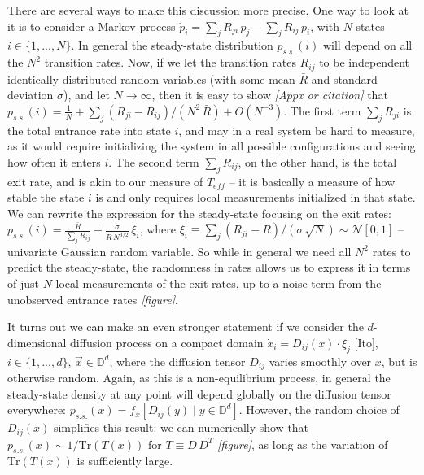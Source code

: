 \documentclass[11pt]{article}
\renewcommand{\v}[1]{\ensuremath{\vec{#1}}} %
\newcommand{\tr}{\mbox{Tr}}
\renewcommand{\=}[1]{\stackrel{#1}{=}} %
\renewcommand{\(}{\left (}
\renewcommand{\)}{\right  )}
\renewcommand{\[}{\left [}
\renewcommand{\]}{\right ]}
\newcommand{\<}{\left <}
\renewcommand{\>}{\right >}
\theoremstyle{definition}
\theoremstyle{remark}
\newcommand{\bigO}[1]{O(#1)}  %
\renewcommand{\todo}[1]{\textit{\color{red}[#1]}}
\begin{document}
There are several ways to make this discussion more precise. One way to look at it is to consider a Markov process $ \dot{p}_i= \sum_j R_{ji}\, p_j - \sum_j R_{ij}\, p_i $, with $ N $ states $ i\in\{1,...,N\} $. In general the steady-state distribution $ p_{s.s.}(i) $ will depend on all the $ N^2 $ transition rates. Now, if we let the transition rates $ R_{ij} $ to be independent identically distributed random variables (with some mean $ \bar{R} $ and standard deviation $ \sigma $), and let $ N \rightarrow \infty$, then it is easy to show \todo{Appx or citation} that $ p_{s.s.}(i)= \frac{1}{N} + \sum_j (R_{ji} - R_{ij})/(N^2\,\bar{R}) + \bigO{N^{-3}}$. The first term $ \sum_j R_{ji} $ is the total entrance rate into state $ i $, and may in a real system be hard to measure, as it would require initializing the system in all possible configurations and seeing how often it enters $ i $. The second term $ \sum_j R_{ij} $, on the other hand, is the total exit rate, and is akin to our measure of $ T_{eff} $ -- it is basically a measure of how stable the state $ i $ is and only requires local measurements initialized in that state. We can rewrite the expression for the steady-state focusing on the exit rates: $ p_{s.s.}(i)= \frac{\bar{R}}{\sum_j R_{ij}} + \frac{\sigma}{\bar{R}\,N^{3/2}}\, \xi_i$, where $ \xi_i \equiv  \sum_j \(R_{ji}-\bar{R}\)/\(\sigma\,\sqrt{N}\)\sim 
\mathcal{N}[0,1]$ -- univariate Gaussian random variable. So while in general we need all $ N^2 $ rates to predict the steady-state, the randomness in rates allows us to express it in terms of just $ N $ local measurements of the exit rates, up to a noise term from  the unobserved entrance rates \todo{figure}.

It turns out we can make an even stronger statement if we consider the $ d $-dimensional diffusion process on a compact domain $ \dot{x}_i = D_{ij}(x)\cdot\xi_j $ [Ito], $ i\in\{1,...,d\} $, $ \v{x}\in\mathbb{D}^d $, where the diffusion tensor $ D_{ij} $ varies smoothly over $ x $, but is otherwise random. Again, as this is a non-equilibrium process, in general the steady-state density at any point will depend globally on the diffusion tensor everywhere: $ p_{s.s.}(x) = f_x\[D_{ij}(y)\; |\; y\in \mathbb{D}^d \]$. However, the random choice of $ D_{ij}(x) $ simplifies this result: we can numerically show that $ p_{s.s.}(x) \sim 1/\tr\(T(x)\) $ for $ T \equiv D\, D^T$ \todo{figure}, as long as the variation of $ \tr\(T(x)\) $ is sufficiently large. 
\end{document}
